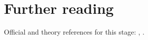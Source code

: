 \section{Further reading}
\label{sec:impostors:further_reading}
Official and theory references for this stage: \cite{CMS:2017yfk}, \cite{CMS:2016lmd}.

\begin{pitfalls}
\end{pitfalls}

\begin{exercises}
\item {}
\item {}
\end{exercises}
